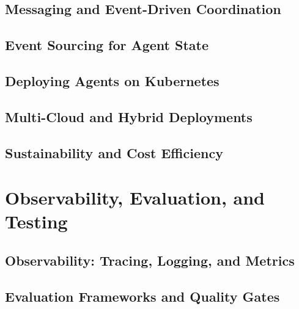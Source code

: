 \chapter{Messaging and Event-Driven Coordination}
\label{ch:messaging}


\chapter{Event Sourcing for Agent State}
\label{ch:event-sourcing}


\chapter{Deploying Agents on Kubernetes}
\label{ch:kubernetes}


\chapter{Multi-Cloud and Hybrid Deployments}
\label{ch:multi-cloud}


\chapter{Sustainability and Cost Efficiency}
\label{ch:sustainability}



\part{Observability, Evaluation, and Testing}
\label{part:observability}

\chapter{Observability: Tracing, Logging, and Metrics}
\label{ch:observability}


\chapter{Evaluation Frameworks and Quality Gates}
\label{ch:evaluation}


